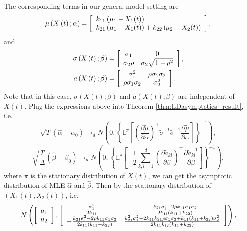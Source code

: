 \documentclass[11pt]{article}%
\theoremstyle{definition}
\begin{document}
The corresponding terms in our general model setting are%
\[
\mu\left(  X\left(  t\right)  ;\alpha\right)  =\left[
\begin{array}
[c]{l}%
{k_{11}}\left(  {\mu_{1}-X_{1}(t)}\right) \\
{k_{21}}\left(  {\mu_{1}-X_{1}(t)}\right)  +{k_{22}}\left(  {\mu_{2}-X_{2}%
(t)}\right)
\end{array}
\right]  ,
\]
and%
\begin{align*}
\sigma\left(  X\left(  t\right)  ;\beta\right)   &  =\left[
\begin{array}
[c]{cc}%
{\sigma_{1}} & {0}\\
{\sigma_{2}\rho} & {\sigma_{2}\sqrt{1-\rho^{2}}}%
\end{array}
\right]  ,\\
a\left(  X\left(  t\right)  ;\beta\right)   &  =\left[
\begin{array}
[c]{cc}%
{\sigma_{1}^{2}} & {\rho\sigma_{1}\sigma_{2}}\\
{\rho\sigma_{1}\sigma_{2}} & {\sigma_{2}^{2}}%
\end{array}
\right]  .
\end{align*}
Note that in this case, $\sigma\left(  X\left(  t\right)  ;\beta\right)  $ and
$a\left(  X\left(  t\right)  ;\beta\right)  $ are independent of $X\left(
t\right)  $. Plug the expressions above into Theorem
\ref{thm:LDasymptotics_result}, i.e.%
\[
\sqrt{T}\left(  \widehat{\alpha}-\alpha_{0}\right)  \rightarrow_{d}N\left(
0,\left\{  \mathbb{E}^{\pi}\left[  \left(  \frac{\partial\widetilde{\mu}%
}{\partial\alpha}\right)  ^{\top}\widetilde{\sigma}^{-T}\widetilde{\sigma
}^{-1}\frac{\partial\widetilde{\mu}}{\partial\alpha}\right]  \right\}
^{-1}\right)  ,
\]%
\[
\sqrt{\frac{T}{\Delta}}\left(  \widehat{\beta}-\beta_{0}\right)
\rightarrow_{d}N\left(  0,\left\{  \mathbb{E}^{\pi}\left[  -\frac{1}{2}%
\sum_{k,l=1}^{d}\left(  \frac{\partial\widetilde{a}_{kl}}{\partial\beta
}\right)  ^{\top}\frac{\partial\widetilde{a}_{kl}^{-1}}{\partial\beta}\right]
\right\}  ^{-1}\right)  ,
\]
where $\pi$ is the stationary distribution of $X\left(  t\right)  $, we can
get the asymptotic distribution of MLE $\widehat{\alpha}$ and $\widehat{\beta
}$. Then by the stationary distribution of $\left(  X_{1}(t),X_{2}(t)\right)
$, i.e.
\[
N\left(  \left[
\begin{array}
[c]{c}%
{\mu}_{1}\\
{\mu}_{2}%
\end{array}
\right]  ,\left[
\begin{array}
[c]{cc}%
{\frac{\sigma_{1}^{2}}{2k_{11}}} & {-\frac{k_{21}\sigma_{1}^{2}-2\rho
k_{11}\sigma_{1}\sigma_{2}}{2k_{11}\left(  k_{11}+k_{22}\right)  }}\\
{-\frac{k_{21}\sigma_{1}^{2}-2\rho k_{11}\sigma_{1}\sigma_{2}}{2k_{11}\left(
k_{11}+k_{22}\right)  }} & {\frac{k_{21}^{2}\sigma_{1}^{2}-2k_{11}k_{21}%
\rho\sigma_{1}\sigma_{2}+k_{11}\left(  k_{11}+k_{22}\right)  \sigma_{2}^{2}%
}{2k_{11}k_{22}\left(  k_{11}+k_{22}\right)  }}%
\end{array}
\right]  \right)  ,
\]
\end{document}
